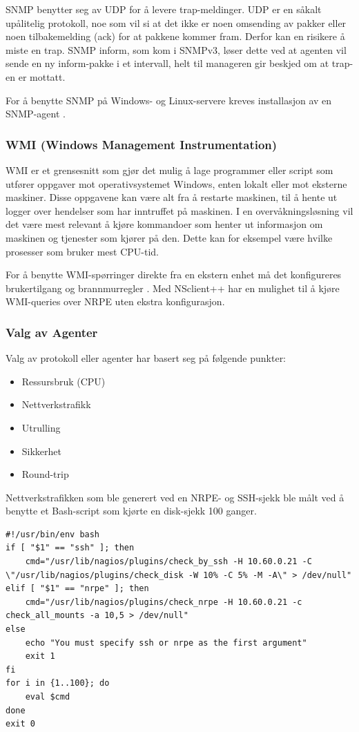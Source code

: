 SNMP benytter seg av UDP for å levere trap-meldinger. UDP er en såkalt upålitelig protokoll, noe som vil si at det ikke er noen omsending av pakker eller noen tilbakemelding (ack) for at pakkene kommer fram. Derfor kan en risikere å miste en trap. SNMP inform, som kom i SNMPv3, løser dette ved at agenten vil sende en ny inform-pakke i et intervall, helt til manageren gir beskjed om at trap-en er mottatt.

For å benytte SNMP på Windows- og Linux-servere kreves installasjon av en SNMP-agent \cite{mssnmp} \cite{netsnmp}.

\subsubsection{WMI (Windows Management Instrumentation)}
WMI er et grensesnitt som gjør det mulig å lage programmer eller script som utfører oppgaver mot operativsystemet Windows, enten lokalt eller mot eksterne maskiner. Disse oppgavene kan være alt fra å restarte maskinen, til å hente ut logger over hendelser som har inntruffet på maskinen. I en overvåkningsløsning vil det være mest relevant å kjøre kommandoer som henter ut informasjon om maskinen og tjenester som kjører på den. Dette kan for eksempel være hvilke prosesser som bruker mest CPU-tid.

For å benytte WMI-spørringer direkte fra en ekstern enhet må det konfigureres brukertilgang og brannmurregler \cite{wmiremote}. Med NSclient++ har en mulighet til å kjøre WMI-queries over NRPE uten ekstra konfigurasjon.

\subsubsection{Valg av Agenter}
Valg av protokoll eller agenter har basert seg på følgende punkter:
\begin{itemize}
	\item Ressursbruk (CPU)
	\item Nettverkstrafikk
	\item Utrulling
	\item Sikkerhet
	\item Round-trip
\end{itemize}
Nettverkstrafikken som ble generert ved en NRPE- og SSH-sjekk ble målt ved å benytte et Bash-script som kjørte en disk-sjekk 100 ganger. 

\begin{lstlisting}
#!/usr/bin/env bash
if [ "$1" == "ssh" ]; then
    cmd="/usr/lib/nagios/plugins/check_by_ssh -H 10.60.0.21 -C \"/usr/lib/nagios/plugins/check_disk -W 10% -C 5% -M -A\" > /dev/null"
elif [ "$1" == "nrpe" ]; then
    cmd="/usr/lib/nagios/plugins/check_nrpe -H 10.60.0.21 -c check_all_mounts -a 10,5 > /dev/null"
else
    echo "You must specify ssh or nrpe as the first argument"
    exit 1
fi
for i in {1..100}; do
    eval $cmd
done
exit 0
\end{lstlisting}

